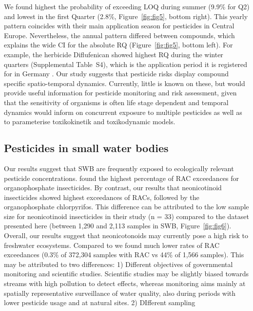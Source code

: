 \documentclass[journal=esthag,manuscript=article]{achemso}
\begin{document}
We found highest the probability of exceeding LOQ during summer (9.9\% for Q2) and lowest in the first Quarter (2.8\%, Figure~\ref{fig:fig5}, bottom right).
This yearly pattern coincides with their main application season for pesticides in Central Europe.
Nevertheless, the annual pattern differed between compounds, which explains the wide CI for the absolute RQ (Figure~\ref{fig:fig5}, bottom left).
For example, the herbicide Diflufenican showed highest RQ during the winter quarters (Supplemental Table~S4), which is the application period it is registered for in Germany \citep{bvl_online_2016}.
Our study suggests that pesticide risks display compound specific spatio-temporal dynamics.
Currently, little is known on these, but would provide useful information for pesticide monitoring and risk assessment, given that the sensitivity of organisms is often life stage dependent
and temporal dynamics would inform on concurrent exposure to multiple pesticides as well as to parameterise toxikokinetik and toxikodynamic models.


\subsection{Pesticides in small water bodies}
Our results suggest that SWB are frequently exposed to ecologically relevant pesticide concentrations.
\citet{stehle_pesticide_2015} found the highest percentage of RAC exceedances for organophosphate insecticides. 
By contrast, our results that neonicotinoid insecticides showed highest exceedances of RACs, followed by the organophosphate chlorpyrifos. 
This difference can be attributed to the low sample size for neonicotinoid insecticides in their study (n = 33) compared to the dataset presented here (between 1,290 and 2,113 samples in SWB, Figure~\ref{fig:fig6}). 
Overall, our results suggest that neonicotonoids may currently pose a high risk to freshwater ecosystems.
Compared to \citet{stehle_pesticide_2015} we found much lower rates of RAC exceedances (0.3\% of 372,304 samples with RAC vs 44\% of 1,566 samples). 
This may be attributed to two differences: 1) Different objectives of governmental monitoring and scientific studies. Scientific studies may be slightly biased towards streams with high pollution to detect effects, whereas monitoring aims mainly at spatially representative surveillance of water quality, also during periods with lower pesticide usage and at natural sites. 2) DIfferent sampling 
\end{document}
